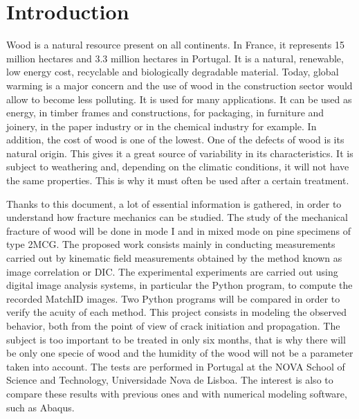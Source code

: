 
\chapter{Introduction} %

\label{Introduction} %


Wood is a natural resource present on all continents. In France, it represents 15 million hectares and 3.3 million hectares in Portugal. It is a natural, renewable, low energy cost, recyclable and biologically degradable material. Today, global warming is a major concern and the use of wood in the construction sector would allow to become less polluting. It is used for many applications. It can be used as energy, in timber frames and constructions, for packaging, in furniture and joinery, in the paper industry or in the chemical industry for example. In addition, the cost of wood is one of the lowest. One of the defects of wood is its natural origin. This gives it a great source of variability in its characteristics. It is subject to weathering and, depending on the climatic conditions, it will not have the same properties. This is why it must often be used after a certain treatment.

Thanks to this document, a lot of essential information is gathered, in order to understand how fracture mechanics can be studied. The study of the mechanical fracture of wood will be done in mode I and in mixed mode on pine specimens of type 2MCG. The proposed work consists mainly in conducting measurements carried out by kinematic field measurements obtained by the method known as image correlation or DIC. The experimental experiments are carried out using digital image analysis systems, in particular the Python program, to compute the recorded MatchID images. Two Python programs will be compared in order to verify the acuity of each method. This project consists in modeling the observed behavior, both from the point of view of crack initiation and propagation. The subject is too important to be treated in only six months, that is why there will be only one specie of wood and the humidity of the wood will not be a parameter taken into account. The tests are performed in Portugal at the NOVA School of Science and Technology, Universidade Nova de Lisboa. The interest is also to compare these results with previous ones and with numerical modeling software, such as Abaqus.

